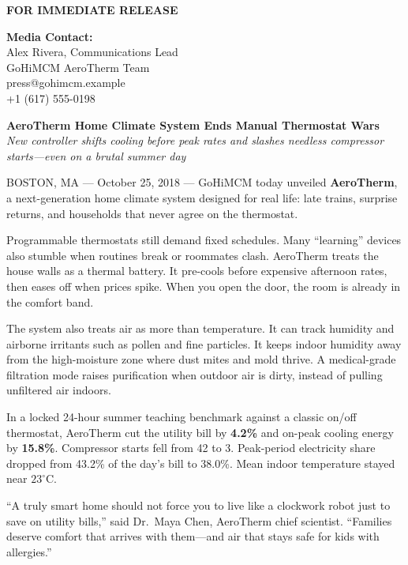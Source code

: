 \documentclass[11pt]{article}
\begin{document}
\noindent\textbf{FOR IMMEDIATE RELEASE}
\hfill
\begin{minipage}[t]{0.42\textwidth}
\raggedleft
\small
\textbf{Media Contact:}\\
Alex Rivera, Communications Lead\\
GoHiMCM AeroTherm Team\\
press@gohimcm.example\\
+1 (617) 555-0198
\end{minipage}

\vspace{1.0em}
\begin{center}
{\Large\bfseries AeroTherm Home Climate System Ends Manual Thermostat Wars}\\[0.35em]
{\large\itshape New controller shifts cooling before peak rates and
slashes needless compressor starts---even on a brutal summer day}
\end{center}

\vspace{0.7em}
\noindent
BOSTON, MA --- October 25, 2018 --- GoHiMCM today unveiled
\textbf{AeroTherm}, a next-generation home climate system designed for
real life: late trains, surprise returns, and households that never agree
on the thermostat.

\medskip
\noindent
Programmable thermostats still demand fixed schedules.
Many ``learning'' devices also stumble when routines break or roommates
clash.
AeroTherm treats the house walls as a thermal battery.
It pre-cools before expensive afternoon rates, then eases off when prices spike.
When you open the door, the room is already in the comfort band.

\medskip
\noindent
The system also treats air as more than temperature.
It can track humidity and airborne irritants such as pollen and fine particles.
It keeps indoor humidity away from the high-moisture zone where dust mites
and mold thrive.
A medical-grade filtration mode raises purification when outdoor air is
dirty, instead of pulling unfiltered air indoors.

\medskip
\noindent
In a locked 24-hour summer teaching benchmark against a classic on/off
thermostat, AeroTherm cut the utility bill by \textbf{4.2\%} and
on-peak cooling energy by \textbf{15.8\%}.
Compressor starts fell from 42 to 3.
Peak-period electricity share dropped from 43.2\% of the day's bill to 38.0\%.
Mean indoor temperature stayed near $23^\circ\mathrm{C}$.

\medskip
\noindent
``A truly smart home should not force you to live like a clockwork robot
just to save on utility bills,'' said Dr.\ Maya Chen, AeroTherm chief
scientist.
``Families deserve comfort that arrives with them---and air that stays
safe for kids with allergies.''
\end{document}
